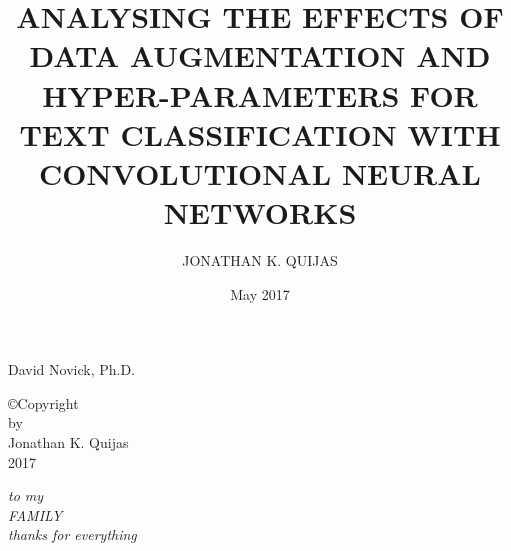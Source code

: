\documentclass[12pt]{report}
\begin{document}
\graphicspath{{Diagrams/}}

\setcounter{tocdepth}{2}


\title{ANALYSING THE EFFECTS OF DATA AUGMENTATION AND HYPER-PARAMETERS FOR TEXT CLASSIFICATION WITH CONVOLUTIONAL NEURAL NETWORKS}

\author{JONATHAN K. QUIJAS}
\date{May 2017}

                 {David Novick, Ph.D.}


\makesigpage

\begin{CenteredPage}
\copyright Copyright\\[0.2in]
by\\[0.2in]
Jonathan K. Quijas\\[0.2in]
2017
\end{CenteredPage}

\begin{CenteredPage}
{\it to my\\[0.2in]
FAMILY\\[0.2in]
thanks for everything}
\end{CenteredPage}

\maketitlepage
\end{document}
